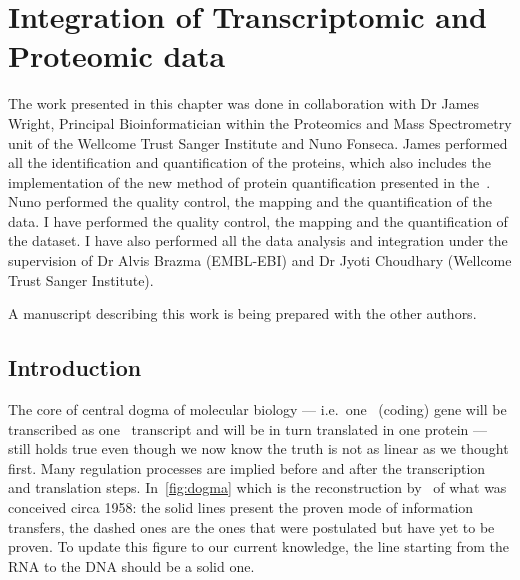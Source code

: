 



\chapter{Integration of Transcriptomic and Proteomic data}
\label{ch:Integration}
The work presented in this chapter was done in collaboration with Dr James Wright,
Principal Bioinformatician within the Proteomics and Mass Spectrometry unit of the
Wellcome Trust Sanger Institute and Nuno Fonseca. James performed all the
identification and quantification of the proteins, which also includes the
implementation of the new method of protein quantification presented in
the~. Nuno performed the quality
control, the mapping and the quantification of the  data.
I have performed the quality control, the mapping and the quantification of the
 dataset. I have also performed
all the data analysis and integration under the supervision of Dr Alvis Brazma
(EMBL-EBI) and Dr Jyoti Choudhary (Wellcome Trust Sanger Institute).

A manuscript describing this work is being prepared with the other authors.

\section{Introduction}
\label{sec:IntegrationIntro}
%
%

The core of central dogma of molecular biology --- i.e.\ one \DNA\ (coding) gene
will be transcribed as one \mRNA\ transcript and will be in turn translated in
one protein --- still holds true even though we now know the truth is not as
linear as we thought first. Many regulation processes are implied before
and after the transcription and translation steps.
In~\cref{fig:dogma} which is the reconstruction by~\cite{Crick:1958} of
what was conceived circa 1958: the solid lines present the proven mode of
information transfers, the dashed ones are the ones that were postulated but
have yet to be proven. To update this figure to our current knowledge, the line
starting from the RNA to the DNA should be a solid one.

